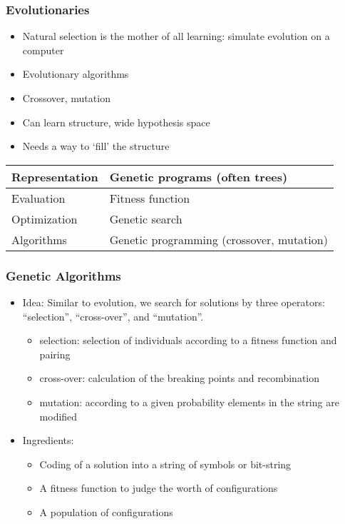 \documentclass[UTF8,11pt,colorlinks,compress,openany]{beamer}%
\begin{document}
\begin{frame}\frametitle{Evolutionaries}
\begin{itemize}
	\item Natural selection is the mother of all learning: simulate evolution on a computer
	\item Evolutionary algorithms
	\item Crossover, mutation
	\item Can learn structure, wide hypothesis space
	\item Needs a way to `fill' the structure
\end{itemize}
\begin{table}
\abovetabulinesep=1mm
\belowtabulinesep=1mm
\begin{tabu}{l|l}
\hline
Representation &Genetic programs (often trees)\\
\hline
Evaluation &Fitness function\\
\hline
Optimization &Genetic search\\
\hline
Algorithms &Genetic programming (crossover, mutation)\\
\hline
\end{tabu}
\end{table}
\end{frame}

\begin{frame}\frametitle{Genetic Algorithms}
\begin{itemize}
	\item Idea: Similar to evolution, we search for solutions by three operators: ``selection'', ``cross-over'', and ``mutation''.
	\begin{itemize}
		\item selection: selection of individuals according to a fitness function and pairing
		\item cross-over: calculation of the breaking points and recombination
		\item mutation: according to a given probability elements in the string are modified
	\end{itemize}
	\item Ingredients:
	\begin{itemize}
		\item Coding of a solution into a string of symbols or bit-string
		\item A fitness function to judge the worth of configurations
		\item A population of configurations
	\end{itemize}
\end{itemize}
\end{frame}
\end{document}
